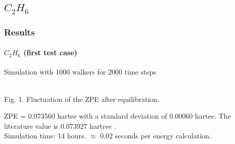 \documentclass{beamer}
\begin{document}
\subsection{$C_2 H_6$}
\begin{frame}
\frametitle{Results}
\framesubtitle{$C_2 H_6$ (first test case)}
Simulation with 1000 walkers for 2000 time steps
\begin{center}
\\
Fig. 1. Fluctuation of the ZPE after equilibration.
\end{center}
ZPE = 0.073560 hartee with a standard deviation of 0.00060 hartee. The literature value is 0.073927 hartree \cite{c2h6}.\\
Simulation time: 14 hours. $\approx$ 0.02 seconds per energy calculation.

\end{frame}
\end{document}
